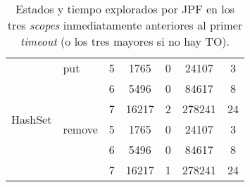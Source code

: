 \begin{table}[H]
\begin{tabular}{ c| l| c c c c c}
\multirow{6}{*}{HashSet} 
& put
& 5 & 1765  & 0 & 24107 & 3 \\
& & 6 & 5496  & 0 & 84617 & 8 \\
& & 7 & 16217 & 2 & 278241  & 24  \\

\cline{2-7}
& remove
& 5 & 1765  & 0 & 24107 & 3 \\
& & 6 & 5496  & 0 & 84617 & 8 \\
& & 7 & 16217 & 1 & 278241  & 24  \\
\hline

\end{tabular}%
\caption{Estados y tiempo explorados por JPF en los tres \emph{scopes} inmediatamente anteriores al primer \emph{timeout} (o los tres mayores si no hay TO).}
\label{tab:results-jpf1-short}
\end{table}

